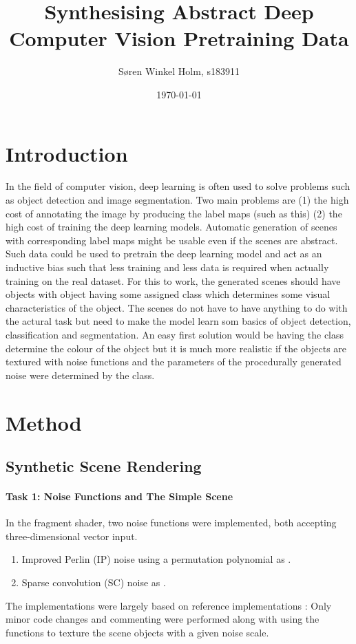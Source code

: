 \documentclass[12pt,fleqn]{article}
\title{Synthesising Abstract Deep Computer Vision Pretraining Data}
\author{Søren Winkel Holm, s183911}
\date{\today}
\begin{document}
\maketitle
\thispagestyle{fancy}
\tableofcontents
\newpage


\section{Introduction}%
\label{sec:intro}
In the field of computer vision, deep learning is often used to solve problems such as object detection and image segmentation. Two main problems are (1) the high cost of annotating the image by producing the label maps (such as this) (2) the high cost of training the deep learning models. Automatic generation of scenes with corresponding label maps might be usable even if the scenes are abstract. Such data could be used to pretrain the deep learning model and act as an inductive bias such that less training and less data is required when actually training on the real dataset. For this to work, the generated scenes should have objects with object having some assigned class which determines some visual characteristics of the object. The scenes do not have to have anything to do with the actural task but need to make the model learn som basics of object detection, classification and segmentation. An easy first solution would be having the class determine the colour of the object but it is much more realistic if the objects are textured with noise functions and the parameters of the procedurally generated noise were determined by the class.

\section{Method}%
\label{sec:method}
\subsection{Synthetic Scene Rendering}
\paragraph{Task 1: Noise Functions and The Simple Scene}
In the fragment shader, two noise functions were implemented, both accepting three-dimensional vector input.
\begin{enumerate}
    \item Improved Perlin (IP) noise using a permutation polynomial as \citeauthor{mcewan2012efficient} \cite{mcewan2012efficient}.
    \item Sparse convolution (SC) noise as \citeauthor{frisvad2007fast} \cite{frisvad2007fast}.
\end{enumerate}
The implementations were largely based on reference implementations \cite{frisvad2016exploring}:
Only minor code changes and commenting were performed along with using the functions to texture the scene objects with a given noise scale.
\end{document}
